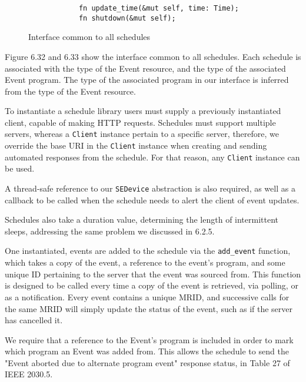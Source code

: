 \begin{figure}[h]
    \begin{center}
        \begin{lstlisting}
            fn update_time(&mut self, time: Time);
            fn shutdown(&mut self);
        \end{lstlisting}
        \label{fig:schedulerimpl}
        \vspace{-10pt}
        \caption{Interface common to all schedules}
    \end{center}
\end{figure}

Figure 6.32 and 6.33 show the interface common to all schedules. Each schedule is associated with the type of the Event resource, and the type of the associated Event program. The type of the associated program in our interface is inferred from the type of the Event resource.

To instantiate a schedule library users must supply a previously instantiated client, capable of making HTTP requests. Schedules must support multiple servers, whereas a \texttt{Client} instance pertain to a specific server, therefore, we override the base URI in the \texttt{Client} instance when creating and sending automated responses from the schedule. For that reason, any \texttt{Client} instance can be used.

A thread-safe reference to our \texttt{SEDevice} abstraction is also required, as well as a callback to be called when the schedule needs to alert the client of event updates.

Schedules also take a duration value, determining the length of intermittent sleeps, addressing the same problem we discussed in 6.2.5.

One instantiated, events are added to the schedule via the \texttt{add\_event} function, which takes a copy of the event, a reference to the event's program, and some unique ID pertaining to the server that the event was sourced from. This function is designed to be called every time a copy of the event is retrieved, via polling, or as a notification. Every event contains a unique MRID, and successive calls for the same MRID will simply update the status of the event, such as if the server has cancelled it.

We require that a reference to the Event's program is included in order to mark which program an Event was added from. This allows the schedule to send the "Event aborted due to alternate program event" response status, in Table 27 of IEEE 2030.5.

